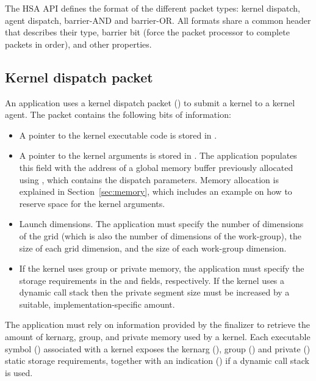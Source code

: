 \documentclass[oneside]{book}
\begin{document}
The HSA API defines the format of the different packet types: kernel dispatch,
agent dispatch, barrier-AND and barrier-OR. All formats share a common header
 that describes their type, barrier bit (force the
packet processor to complete packets in order), and other properties.

\subsection{Kernel dispatch packet}\label{dispatch-packet}

An application uses a kernel dispatch packet
() to submit a kernel to a kernel
agent. The packet contains the following bits of information:
\begin{itemize}[itemsep=1pt,topsep=3pt,partopsep=0pt]
\item A pointer to the kernel executable code is stored in
  .
\item A pointer to the kernel arguments is stored in
  . The application
  populates this field with the address of a global memory buffer previously
  allocated using , which contains the dispatch
  parameters. Memory allocation is explained in Section~\ref{sec:memory}, which
  includes an example on how to reserve space for the kernel arguments.
\item Launch dimensions. The application must specify the number of dimensions
  of the grid (which is also the number of dimensions of the work-group), the
  size of each grid dimension, and the size of each work-group dimension.
\item If the kernel uses group or private memory, the application must specify
  the storage requirements in the
   and
   fields,
  respectively. If the kernel uses a dynamic call stack then the private segment
  size must be increased by a suitable, implementation-specific amount.
\end{itemize}

The application must rely on information provided by the finalizer to retrieve
the amount of kernarg, group, and private memory used by a kernel. Each
executable symbol () associated with a kernel
exposes the kernarg
(), group
() and private
() static storage
requirements, together with an indication
() if a dynamic call
stack is used.
\end{document}

